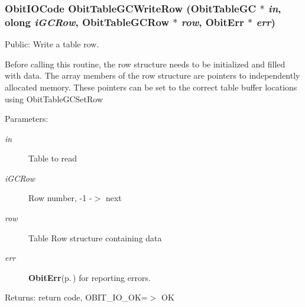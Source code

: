 \subsubsection{\setlength{\rightskip}{0pt plus 5cm}Obit\-IOCode Obit\-Table\-GCWrite\-Row ({\bf Obit\-Table\-GC} $\ast$ {\em in}, {\bf olong} {\em i\-GCRow}, {\bf Obit\-Table\-GCRow} $\ast$ {\em row}, {\bf Obit\-Err} $\ast$ {\em err})}\label{ObitTableGC_8c_a24}


Public: Write a table row. 

Before calling this routine, the row structure needs to be initialized and filled with data. The array members of the row structure are pointers to independently allocated memory. These pointers can be set to the correct table buffer locations using Obit\-Table\-GCSet\-Row \begin{Desc}
\item[Parameters:]
\begin{description}
\item[{\em in}]Table to read \item[{\em i\-GCRow}]Row number, -1 -$>$ next \item[{\em row}]Table Row structure containing data \item[{\em err}]{\bf Obit\-Err}{\rm (p.\,\pageref{structObitErr})} for reporting errors. \end{description}
\end{Desc}
\begin{Desc}
\item[Returns:]return code, OBIT\_\-IO\_\-OK=$>$ OK \end{Desc}
